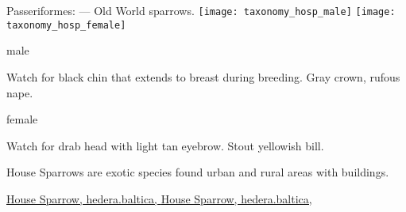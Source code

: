\documentclass[t]{beamer}
\newcommand{\backoneline}{\vspace{-\baselineskip}}
\begin{document}
\begin{frame}{Passeriformes:  — Old World sparrows.}
	\texttt{[image: taxonomy\_hosp\_male]}\hfill
	\texttt{[image: taxonomy\_hosp\_female]}
	
	\backoneline
	
	\begin{multicols}{2}
		male
		
		\medskip
		
		Watch for black chin that extends to breast during breeding. Gray crown, rufous nape.
		\columnbreak
		
		female
				
		\medskip
		
		Watch for drab head with light tan eyebrow. Stout yellowish bill. \phantom{Hidden words to fill space.}
		
		
	\end{multicols}	
	
	House Sparrows are exotic species found urban and rural areas with buildings.
	
	
	\vfilll
	
	\tiny
	
	\href{https://flickr.com/photos/hedera_baltica/32691733707}{House Sparrow, hedera.baltica, } \hfill 
	\href{https://flickr.com/photos/hedera_baltica/52118904483}{House Sparrow, hedera.baltica, }
	
	
\end{frame}
\end{document}
